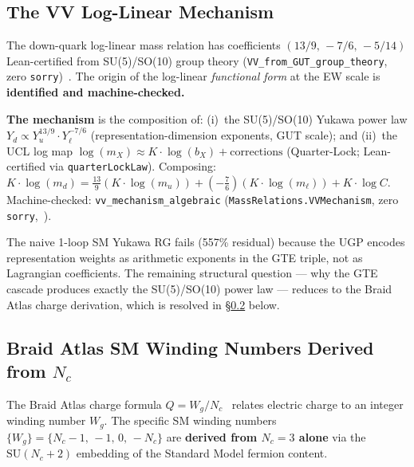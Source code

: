 \documentclass[11pt]{article}
\theoremstyle{remark}
\newcommand{\Nc}{N_c}
\begin{document}
\subsection{The VV Log-Linear Mechanism}
\label{subsec:vv}

The down-quark log-linear mass relation has coefficients $(13/9,\, -7/6,\, -5/14)$
Lean-certified from SU(5)/SO(10) group theory (\texttt{VV\_from\_GUT\_group\_theory},
zero \texttt{sorry})~\cite{Spivack2026_SM_UGP}.
The origin of the log-linear \emph{functional form} at the EW scale is
\textbf{identified and machine-checked.}

\textbf{The mechanism} is the composition of:
(i)~the SU(5)/SO(10) Yukawa power law $Y_d \propto Y_u^{13/9} \cdot Y_\ell^{-7/6}$
(representation-dimension exponents, GUT scale); and
(ii)~the UCL log map $\log(m_X) \approx K \cdot \log(b_X) + \text{corrections}$
(Quarter-Lock; Lean-certified via \texttt{quarterLockLaw}).
Composing:
$K{\cdot}\log(m_d) = \tfrac{13}{9}(K{\cdot}\log(m_u)) + (-\tfrac{7}{6})(K{\cdot}\log(m_\ell)) + K{\cdot}\log C$.
Machine-checked: \texttt{vv\_mechanism\_algebraic}
(\texttt{MassRelations.VVMechanism}, zero \texttt{sorry},~\cite{ugp-lean}).

The naive 1-loop SM Yukawa RG fails (557\% residual) because the UGP encodes
representation weights as arithmetic exponents in the GTE triple, not as Lagrangian
coefficients.
The remaining structural question --- why the GTE cascade produces exactly the
SU(5)/SO(10) power law --- reduces to the Braid Atlas charge
derivation, which is resolved in \S\ref{subsec:charge_derivation} below.

\subsection{Braid Atlas SM Winding Numbers Derived from $\Nc$}
\label{subsec:charge_derivation}

The Braid Atlas charge formula $Q = W_g / \Nc$~\cite{SpivackBraidAtlas} relates
electric charge to an integer winding number $W_g$.
The specific SM winding numbers $\{W_g\} = \{\Nc{-}1,\,-1,\,0,\,-\Nc\}$ are
\textbf{derived from $\Nc = 3$ alone} via the $\mathrm{SU}(\Nc+2)$ embedding of the
Standard Model fermion content.
\end{document}
